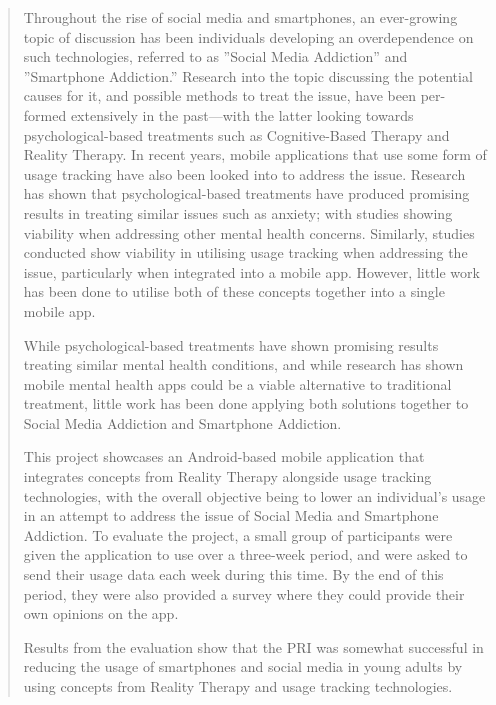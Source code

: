 \documentclass[12pt]{article}
\begin{document}
\begin{abstract}
Throughout the rise of social media and smartphones, an ever-growing topic of discussion has been individuals developing an overdependence on such technologies, referred to as ”Social Media 
Addiction” and ”Smartphone Addiction.” Research into the topic discussing the potential causes for it, and possible methods to treat the issue, have been per- formed extensively in the 
past—with the latter looking towards psychological-based treatments such as Cognitive-Based Therapy and Reality Therapy. In recent years, mobile applications that use some form of usage tracking 
have also been looked into to address the issue. Research has shown that psychological-based treatments have produced promising results in treating similar issues such as anxiety; with studies 
showing viability when addressing other mental health concerns. Similarly, studies conducted show viability in utilising usage tracking when addressing the issue, particularly when integrated 
into a mobile app. However, little work has been done to utilise both of these concepts together into a single mobile app.\newline

While psychological-based treatments have shown promising results treating similar mental health conditions, and while research has shown mobile mental health apps could be a viable alternative 
to traditional treatment, little work has been done applying both solutions together to Social Media Addiction and Smartphone Addiction. \newline

This project showcases an Android-based mobile application that integrates concepts from Reality Therapy alongside usage tracking technologies, with the overall objective being to lower an 
individual's usage in an attempt to address the issue of Social Media and Smartphone Addiction. To evaluate the project, a small group of participants were given the application to use over a 
three-week period, and were asked to send their usage data each week during this time. By the end of this period, they were also provided a survey where they could provide their own opinions 
on the app.\newline

Results from the evaluation show that the PRI was somewhat successful in reducing the usage of smartphones and social media in young adults by using concepts from Reality Therapy and usage 
tracking technologies.


\end{abstract}
\end{document}
